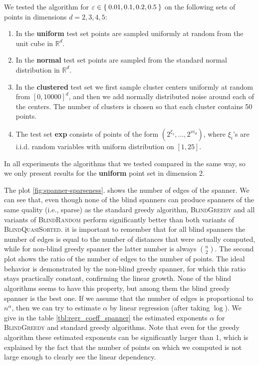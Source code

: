 \documentclass[a4paper,USenglish]{socg-lipics-v2018}
\newcommand{\eps}{\varepsilon}
\begin{document}
We tested the algorithm for $\eps \in \Set{0.01, 0.1, 0.2, 0.5}$ on the following sets of points in dimensions $d = 2,3,4,5$:
\begin{enumerate}
    \item In the \textbf{uniform} test set points are sampled uniformly at
        random from the unit cube in $\mathbb{R}^d$.
    \item In the \textbf{normal} test set points are sampled from the standard
        normal distribution in $\mathbb{R}^d$.
    \item In the \textbf{clustered} test set we first sample cluster centers uniformly 
        at random from $[0,10000]^d$, and then we add normally distributed noise around
        each of the centers. The number of clusters is chosen so that each cluster
        contains 50 points.
    \item The test set \textbf{exp} consists of points of the form $(2^{\xi_1}, \dots, 2^{xi_d})$,
        where $\xi_i$'s are i.i.d. random variables with uniform distribution on $[1,25]$.
\end{enumerate}
In all experiments the algorithms that we tested compared in the same way,
so we only present results for the \textbf{uniform} point set in dimension 2.

The plot \ref{fig:spanner-sparseness}.
shows the number of edges of the spanner.
We can see that, even though none of the blind spanners can produce
spanners of the same quality (i.e., sparse) as the standard greedy algorithm,
\textsc{BlindGreedy} and all variants of \textsc{BlindRandom}
perform significantly better than both variants of \textsc{BlindQuasiSorted}.
it is important to remember that for all blind spanners the number of edges
is equal to the number of distances that were actually computed, while
for non-blind greedy spanner the latter number is always $n \choose 2$.
The second plot shows the ratio of the number of edges to the number of points.
The ideal behavior is demonstrated by the non-blind greedy spanner,
for which this ratio stays practically constant, confirming the linear growth.
None of the blind algorithms seems to have this property, but among them
the blind greedy spanner is the best one. If we assume that the number of edges
is proportional to $n^\alpha$, then we can try to estimate $\alpha$ by 
linear regression (after taking $\log$).  We give in the table \ref{tbl:regr_coeff_spanner}
the estimated exponents $\alpha$ for \textsc{BlindGreedy} and standard
greedy algorithms. Note that even for the greedy algorithm these estimated
exponents can be significantly larger than 1,
which is explained by the fact that the number of points
on which we computed is not large enough to clearly see
the linear dependency.
\end{document}
